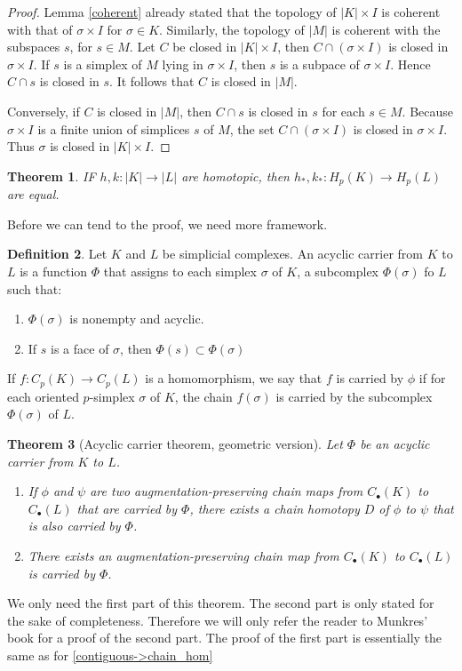 \documentclass[draft,toc=bib]{scrartcl}
\theoremstyle{plain}
\newtheorem{theorem}{Theorem}[section]
\theoremstyle{definition}
\newtheorem	{definition}[theorem]{Definition}
\theoremstyle{remark}
\begin{document}
\begin{proof}
	Lemma \ref{coherent} already stated that the topology of $|K|\times I$ is coherent with that of $\sigma\times I$ for $\sigma\in K$. Similarly, the topology of $|M|$ is coherent with the subspaces $s$, for $s\in M$. Let $C$ be closed in $|K|\times I$, then $C\cap(\sigma\times I)$ is closed in $\sigma\times I$. If $s$ is a simplex of $M$ lying in $\sigma\times I$, then $s$ is a subpace of $\sigma\times I$. Hence $C\cap s$ is closed in $s$. It follows that $C$ is closed in $|M|$.
	
	Conversely, if $C$ is closed in $|M|$, then $C\cap s$ is closed in $s$ for each $s\in M$. Because $\sigma\times I$ is a finite union of simplices $s$ of $M$, the set $C\cap(\sigma\times I)$ is closed in $\sigma\times I$. Thus $\sigma$ is closed in $|K|\times I$.
\end{proof}



\begin{theorem}%
	IF $h,k:|K|\to |L|$ are homotopic, then $h_\ast,k_\ast: H_p(K)\to H_p(L)$ are equal.
\end{theorem}
Before we can tend to the proof, we need more framework.
\begin{definition}
	Let $K$ and $L$ be simplicial complexes. An acyclic carrier from $K$ to $L$ is a function $\Phi$ that assigns to each simplex $\sigma$ of $K$, a subcomplex $\Phi(\sigma)$ fo $L$ such that:
	\begin{enumerate}
		\item $\Phi(\sigma)$ is nonempty and acyclic.
		\item If $s$ is a face of $\sigma$, then $\Phi(s)\subset \Phi(\sigma)$
	\end{enumerate}
If $f: C_p(K)\to C_p(L)$ is a homomorphism, we say that $f$ is carried by $\phi$ if for each oriented $p$-simplex $\sigma$ of $K$, the chain $f(\sigma)$ is carried by the subcomplex $\Phi(\sigma)$ of $L$.
\end{definition}

\begin{theorem}[Acyclic carrier theorem, geometric version]\label{acyclic-carrier-thm}%
	Let $\Phi$ be an acyclic carrier from $K$ to $L$.
	\begin{enumerate}
		\item If $\phi$ and $\psi$ are two augmentation-preserving chain maps from $C_\bullet(K)$ to $C_\bullet(L)$ that are carried by $\Phi$, there exists a chain homotopy $D$ of $\phi$ to $\psi$ that is also carried by $\Phi$.
		\item There exists an augmentation-preserving chain map from $C_\bullet(K)$ to $C_\bullet(L)$ is carried by $\Phi$.
	\end{enumerate}
\end{theorem}
We only need the first part of this theorem. The second part is only stated for the sake of completeness. Therefore we will only refer the reader to Munkres' book for a proof of the second part. The proof of the first part is essentially the same as for \autoref{contiguous->chain_hom}
\end{document}
